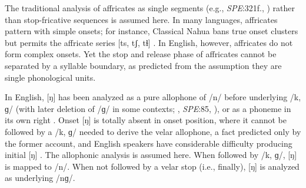\documentclass[12pt]{article}
\begin{document}
The traditional analysis of affricates as single segments (e.g., \emph{SPE}:321f., \citealp[24]{Jakobson1961}) rather than stop-fricative sequences \citep[e.g.,][]{Hualde1988,Lombardi1990} is assumed here. In many languages, affricates pattern with simple onsets; for instance, Classical Nahua bans true onset clusters but permits the affricate series [ts, tʃ, tɬ] \citep[9]{Launey2011}. In English, however, affricates do not form complex onsets. Yet the stop and release phase of affricates cannot be separated by a syllable boundary, as predicted from the assumption they are single phonological units.

In English, [ŋ] has been analyzed as a pure allophone of /n/ before underlying /k, ɡ/ (with later deletion of /ɡ/ in some contexts; \citealt[65f.]{Borowsky1986}, \emph{SPE}:85, \citealt[62]{Halle1985a}), or as a phoneme in its own right \citep[e.g.,][]{Jusczyk2002,Sapir1925}. Onset [ŋ] is totally absent in onset position, where it cannot be followed by a /k, ɡ/ needed to derive the velar allophone, a fact predicted only by the former account, and English speakers have considerable difficulty producing initial [ŋ] \citep{Rusaw2009}. The allophonic analysis is assumed here. When followed by /k, ɡ/, [ŋ] is mapped to /n/. When not followed by a velar stop (i.e., finally), [ŋ] is analyzed as underlying /nɡ/.

% 
% 



\end{document}
